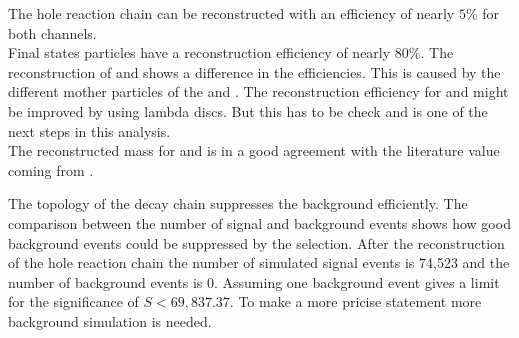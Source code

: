 The hole reaction chain can be reconstructed with an efficiency of nearly $5\%$ for both channels.\\
Final states particles have a reconstruction efficiency of nearly $80\%$.
The reconstruction of \lam and \alam shows a difference in the efficiencies.
This is caused by the different mother particles of the \lam and \alam. 
The reconstruction efficiency for \lam and \alam might be improved by using lambda discs.
But this has to be check and is one of the next steps in this analysis.\\
The reconstructed mass for \excitedcascade and \excitedanticascade is in a good agreement with the literature value coming from \cite{PDG}.

The topology of the decay chain suppresses the background efficiently.
The comparison between the number of signal and background events shows how good background events could be suppressed by the selection.
After the reconstruction of the hole reaction chain the number of simulated signal events is 74,523 and the number of background events is 0. 
Assuming one background event gives a limit for the significance of $S<69,837.37$.
To make a more pricise statement more background simulation is needed. 

 
  


